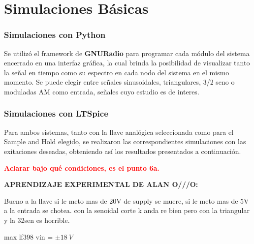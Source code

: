 


\section{Simulaciones Básicas}

\subsubsection{Simulaciones con Python}
Se utilizó el framework de \textbf{GNURadio} para programar cada módulo del sistema encerrado en una interfaz gráfica, la cual brinda la posibilidad de visualizar tanto la señal en tiempo como su espectro en cada nodo del sistema en el mismo momento. Se puede elegir entre señales sinusoidales, triangulares, 3/2 seno o moduladas AM como entrada, señales cuyo estudio es de interes.

\subsubsection{Simulaciones con LTSpice}
Para ambos sistemas, tanto con la llave analógica seleccionada como para el Sample and Hold elegido, se realizaron las correspondientes simulaciones con las exitaciones deseadas, obteniendo así los resultados presentados a continuación.

\textcolor{red}{\textbf{Aclarar bajo qué condiciones, es el punto 6a.}}

\textcolor{verde}{
\textbf{APRENDIZAJE EXPERIMENTAL DE ALAN O///O:}

Bueno a la llave si le meto mas de 20V de supply se muere, si le meto mas de 5V a la entrada se chotea. con la senoidal corte k anda re bien pero con la triangular y la 32sen es horrible.

}

max lf398 vin = $\pm 18 \ V$

